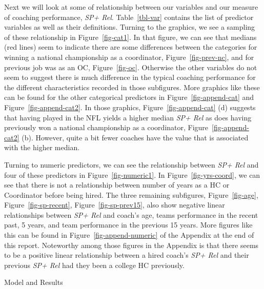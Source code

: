 \documentclass[
  12pt]{article}
\begin{document}
Next we will look at some of relationship between our variables and our
measure of coaching performance, \emph{SP+ Rel}. Table~\ref{tbl-var}
contains the list of predictor variables as well as their definitions.
Turning to the graphics, we see a sampling of these relationship in
Figure~\ref{fig-cat1}. In that figure, we can see that medians (red
lines) seem to indicate there are some differences between the
categories for winning a national championship as a coordinator,
Figure~\ref{fig-prev-nc}, and for previous job was as an OC,
Figure~\ref{fig-oc}. Otherwise the other variables do not seem to
suggest there is much difference in the typical coaching performance for
the different characteristics recorded in those subfigures. More
graphics like these can be found for the other categorical predictors in
Figure~\ref{fig-append-cat} and Figure~\ref{fig-append-cat2}. In those
graphics, Figure~\ref{fig-append-cat} (d) suggests that having played in
the NFL yields a higher median \emph{SP+ Rel} as does having previously
won a national championship as a coordinator,
Figure~\ref{fig-append-cat2} (b). However, quite a bit fewer coaches
have the value that is associated with the higher median.

Turning to numeric predictors, we can see the relationship between
\emph{SP+ Rel} and four of these predictors in
Figure~\ref{fig-numeric1}. In Figure~\ref{fig-yrs-coord}, we can see
that there is not a relationship between number of years as a HC or
Coordinator before being hired. The three remaining subfigures,
Figure~\ref{fig-age}, Figure~\ref{fig-sp-recent},
Figure~\ref{fig-sp-prev15}, also show negative linear relationships
between \emph{SP+ Rel} and coach's age, teams performance in the recent
past, 5 years, and team performance in the previous 15 years. More
figures like this can be found in Figure~\ref{fig-append-numeric} of the
Appendix at the end of this report. Noteworthy among those figures in
the Appendix is that there seems to be a positive linear relationship
between a hired coach's \emph{SP+ Rel} and their previous \emph{SP+ Rel}
had they been a college HC previously.

Model and Results
\end{document}
